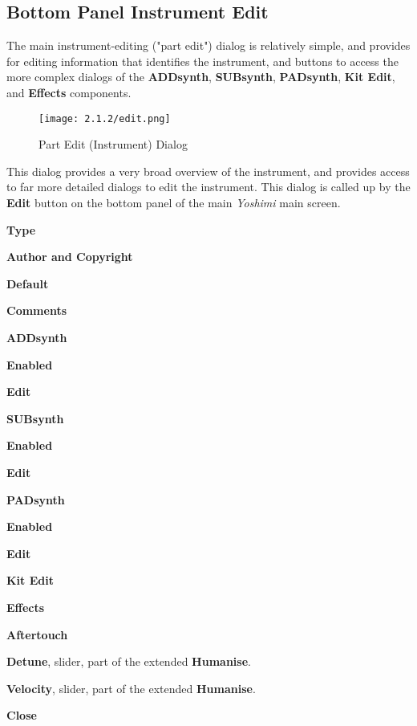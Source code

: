 \subsection{Bottom Panel Instrument Edit}
\label{subsec:bottom_panel_instrument_edit}

   The main instrument-editing ("part edit")
   dialog is relatively simple, and provides for
   editing information that identifies the instrument, and buttons to access
   the more complex dialogs of the
   \textbf{ADDsynth}, \textbf{SUBsynth}, \textbf{PADsynth}, \textbf{Kit Edit},
   and \textbf{Effects} components.


\begin{figure}[H]
   \centering
   \texttt{[image: 2.1.2/edit.png]}
   \caption{Part Edit (Instrument) Dialog}
   \label{fig:instrument_edit_dialog}
\end{figure}

   This dialog provides a very broad overview of the instrument, and
   provides access to far more detailed dialogs to edit the instrument.
   This dialog is called up by the \textbf{Edit} button on the bottom panel
   of the main \textsl{Yoshimi} main screen.

   \begin{enumber}
      \item \textbf{Type}
      \item \textbf{Author and Copyright}
      \item \textbf{Default}
      \item \textbf{Comments}
      \item \textbf{ADDsynth}
      \begin{enumber}
         \item \textbf{Enabled}
         \item \textbf{Edit}
      \end{enumber}
      \item \textbf{SUBsynth}
      \begin{enumber}
         \item \textbf{Enabled}
         \item \textbf{Edit}
      \end{enumber}
      \item \textbf{PADsynth}
      \begin{enumber}
         \item \textbf{Enabled}
         \item \textbf{Edit}
      \end{enumber}
      \item \textbf{Kit Edit}
      \item \textbf{Effects}
      \item \textbf{Aftertouch}
      \item \textbf{Detune}, slider, part of the extended \textbf{Humanise}.
      \item \textbf{Velocity}, slider, part of the extended \textbf{Humanise}.
      \item \textbf{Close}
   \end{enumber}

